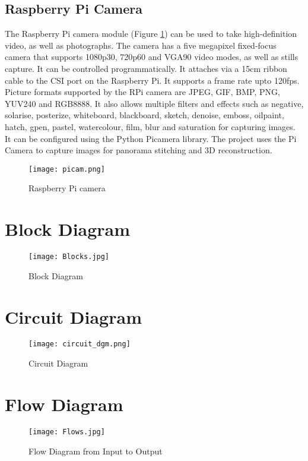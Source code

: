 \subsection{Raspberry Pi Camera}
The Raspberry Pi camera module (Figure \ref{RPi camera}) can be used to take high-definition video, as well as photographs. The camera has a five megapixel fixed-focus camera that supports 1080p30, 720p60 and VGA90 video modes, as well as stills capture. It can be controlled programmatically. It attaches via a 15cm ribbon cable to the CSI port on the Raspberry Pi. 
\newline
\newline
It supports a frame rate upto 120fps. Picture formats supported by the RPi camera are JPEG, GIF, BMP, PNG, YUV240 and RGB8888. It also allows multiple filters and effects such as negative, solarise, posterize, whiteboard, blackboard, sketch, denoise, emboss, oilpaint, hatch, gpen, pastel, watercolour, film, blur and saturation for capturing images.
It can be configured using the Python Picamera library. The project uses the Pi Camera to capture images for panorama stitching and 3D reconstruction.
\begin{figure}[H]
  \centering
  \texttt{[image: picam.png]}
  \caption{Raspberry Pi camera}  \label{RPi camera}	
\end{figure}

\section{Block Diagram}

\begin{figure}[H]
  \centering
  \texttt{[image: Blocks.jpg]}
  \caption{Block Diagram}
  \label{block}	
\end{figure}


\section{Circuit Diagram}

\begin{figure}[H]
  \centering
  \texttt{[image: circuit\_dgm.png]}
  \caption{Circuit Diagram}
  \label{circuit} 
\end{figure}


\section{Flow Diagram}
\begin{figure}[H]
  \centering
  \texttt{[image: Flows.jpg]}
  \caption{Flow Diagram from Input to Output}
  \label{Flow}	
\end{figure}

